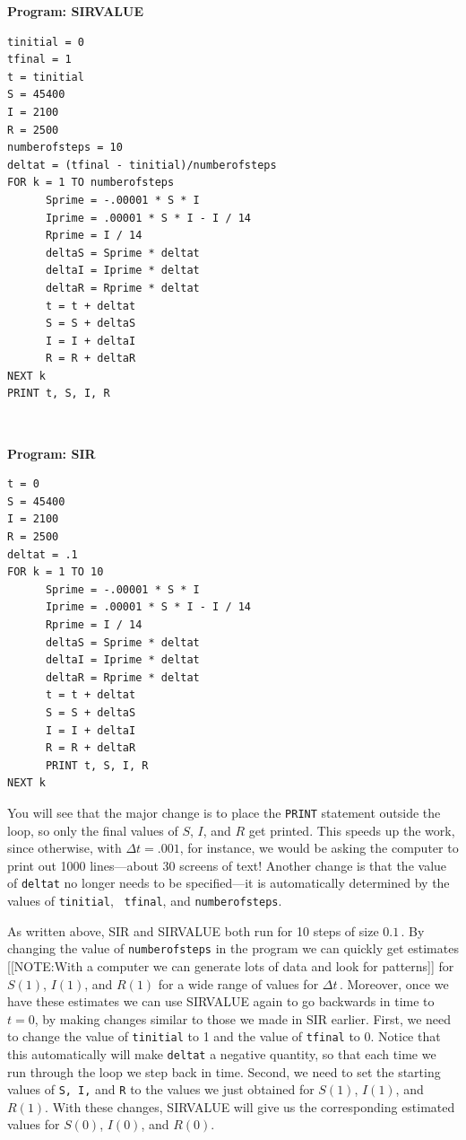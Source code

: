 \footnotesize
\begin{center}

{\bf Program: SIRVALUE}\label{sirvalue}
\end{center}


\begin{verbatim}
tinitial = 0
tfinal = 1
t = tinitial
S = 45400
I = 2100
R = 2500
numberofsteps = 10
deltat = (tfinal - tinitial)/numberofsteps
FOR k = 1 TO numberofsteps
      Sprime = -.00001 * S * I
      Iprime = .00001 * S * I - I / 14
      Rprime = I / 14
      deltaS = Sprime * deltat
      deltaI = Iprime * deltat
      deltaR = Rprime * deltat
      t = t + deltat
      S = S + deltaS
      I = I + deltaI
      R = R + deltaR
NEXT k
PRINT t, S, I, R
\end{verbatim} \ \
\begin{center}

{\bf Program: SIR}
\end{center}


\begin{verbatim}
t = 0
S = 45400
I = 2100
R = 2500
deltat = .1
FOR k = 1 TO 10
      Sprime = -.00001 * S * I
      Iprime = .00001 * S * I - I / 14
      Rprime = I / 14
      deltaS = Sprime * deltat
      deltaI = Iprime * deltat
      deltaR = Rprime * deltat
      t = t + deltat
      S = S + deltaS
      I = I + deltaI
      R = R + deltaR
      PRINT t, S, I, R
NEXT k
\end{verbatim}
\normalsize


You will see that the major change is to place the {\tt PRINT}
statement outside the loop, so only the final values of $S$, $I$, and
$R$ get printed.  This speeds up the work, since otherwise, with
$\Delta t = .001$, for instance, we would be asking the computer to
print out 1000 lines---about 30 screens of text!  Another change is
that the value of {\tt deltat} no longer needs to be specified---it is
automatically determined by the values of {\tt tinitial}, {\tt
  tfinal}, and {\tt numberofsteps}.

As written above, SIR and SIRVALUE both run for 10 steps of size
$0.1\, .$ By changing the value of {\tt numberofsteps} in the program
we can quickly get estimates
[[NOTE:With a computer we can generate lots of data and look for patterns]]
for $S(1)$, $I(1)$, and $R(1)$ for a wide range of values for $\Delta
t \, .$ Moreover, once we have these estimates we can use SIRVALUE
again to go backwards in time to $t=0$, by making changes similar to
those we made in SIR earlier.  First, we need to change the value of
{\tt tinitial} to 1 and the value of {\tt tfinal} to 0.  Notice that
this automatically will make {\tt deltat} a negative quantity, so that
each time we run through the loop we step back in time.  Second, we
need to set the starting values of {\tt S, I,} and {\tt R} to the
values we just obtained for $S(1)$, $I(1)$, and $R(1)$.  With these
changes, SIRVALUE will give us the corresponding estimated values for
$S(0)$, $I(0)$, and $R(0)$.

